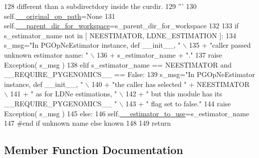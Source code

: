 \begin{DoxyCode}
128 \textcolor{stringliteral}{        different than a subdirectdory inside the curdir.}
129 \textcolor{stringliteral}{        '''}
130         self.\hyperlink{classnegui_1_1pgopneestimator_1_1PGOpNeEstimator_a97a4b47997530ac8dcd56bff004be4ca}{\_\_original\_op\_path}=\textcolor{keywordtype}{None}
131         self.\hyperlink{classnegui_1_1pgopneestimator_1_1PGOpNeEstimator_aa476bb7b0bf29096dd7c91a67d37d8ad}{\_\_parent\_dir\_for\_workspace}=s\_parent\_dir\_for\_workspace
132 
133         \textcolor{keywordflow}{if} s\_estimator\_name \textcolor{keywordflow}{not} \textcolor{keywordflow}{in} [ NEESTIMATOR, LDNE\_ESTIMATION ]:
134             s\_msg=\textcolor{stringliteral}{"In PGOpNeEstimator instance, def \_\_init\_\_, "} \(\backslash\)
135                         + \textcolor{stringliteral}{"caller passed unknown estimator name: "} \(\backslash\)
136                         + s\_estimator\_name + \textcolor{stringliteral}{"."}
137             \textcolor{keywordflow}{raise} Exception( s\_msg )
138         \textcolor{keywordflow}{elif} s\_estimator\_name == NEESTIMATOR \textcolor{keywordflow}{and} \_\_REQUIRE\_PYGENOMICS\_\_ == \textcolor{keyword}{False}:
139             s\_msg=\textcolor{stringliteral}{"In PGOpNeEstimator instance, def \_\_init\_\_, "} \(\backslash\)
140                         + \textcolor{stringliteral}{"the caller has selected "} + NEESTIMATOR \(\backslash\)
141                         + \textcolor{stringliteral}{" as for LDNe estimations, "} \(\backslash\)
142                         + \textcolor{stringliteral}{" but this module has its \_\_REQUIRE\_PYGENOMICS\_\_ "} \(\backslash\)
143                         + \textcolor{stringliteral}{" flag set to false."}
144             \textcolor{keywordflow}{raise} Exception( s\_msg )
145         \textcolor{keywordflow}{else}:
146             self.\hyperlink{classnegui_1_1pgopneestimator_1_1PGOpNeEstimator_a77a1d96335902820fda22a07c902045e}{\_\_estimator\_to\_use}=s\_estimator\_name
147         \textcolor{comment}{#end if unknown name else known}
148 
149         \textcolor{keywordflow}{return}
\end{DoxyCode}


\subsection{Member Function Documentation}
